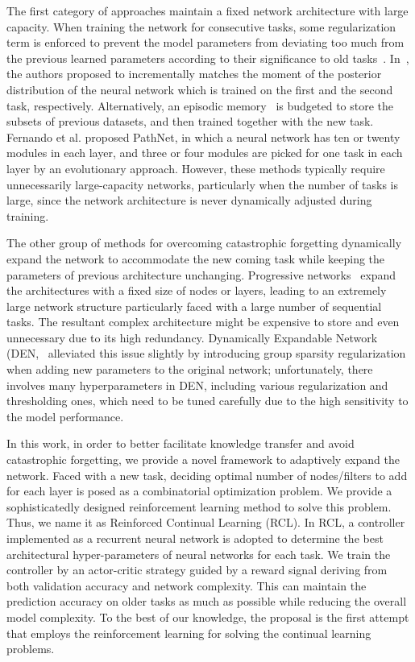 \documentclass{article}
\begin{document}
The first category of approaches maintain a fixed network architecture with large capacity.  When training the network for consecutive tasks, some regularization term is enforced to prevent the model parameters from deviating too much
from the previous learned parameters according to their significance to old tasks~\cite{kirkpatrick1,zenke1}. In~\cite{lee2017overcoming}, the authors proposed to incrementally matches the moment of the posterior distribution of the neural network which is trained on the first and the second task, respectively. Alternatively, an episodic memory~\cite{GradientEpisodicMemory} is budgeted to store the subsets of previous datasets, and then trained together with the new task. 
Fernando et al. \cite{fernando1} proposed PathNet, in which a neural network has ten or twenty modules in each layer, and three or four modules are picked for one task in each layer by an evolutionary approach.  However, these methods typically require unnecessarily large-capacity networks, particularly when the number of tasks is  large, since the network architecture is never dynamically adjusted during training.

The other group of methods for overcoming catastrophic forgetting dynamically expand the network to accommodate the new coming task while keeping the parameters of previous architecture unchanging. Progressive networks~\cite{rusu1} expand the architectures with a fixed size of nodes or layers, leading to an extremely large network structure particularly faced with a large number of sequential tasks. The resultant complex architecture might be expensive to store and even unnecessary due to its high redundancy. Dynamically Expandable Network (DEN,~\cite{yoon1} alleviated this issue slightly by introducing group sparsity regularization when adding new parameters to the original network; unfortunately, there involves many hyperparameters in DEN, including various regularization and thresholding ones, which need to be tuned carefully due to the high sensitivity to the model performance.      


In this work, in order to  better facilitate knowledge transfer and avoid catastrophic forgetting, we provide a novel framework to adaptively expand the network. Faced with a new task, deciding optimal number of nodes/filters to add for each layer is posed as a combinatorial optimization problem. We provide a sophisticatedly designed reinforcement learning method to solve this problem. Thus, we name it as Reinforced Continual Learning (RCL). In RCL, a controller implemented as a recurrent neural network is adopted to determine the best architectural hyper-parameters of neural networks for each task. We train the controller by an actor-critic strategy guided by a reward signal deriving from both validation accuracy and network complexity. This can maintain the prediction accuracy on older tasks as much as possible while reducing the overall model complexity.  To the best of our knowledge, the proposal is the first attempt that employs the reinforcement learning for solving the continual learning problems.
\end{document}

